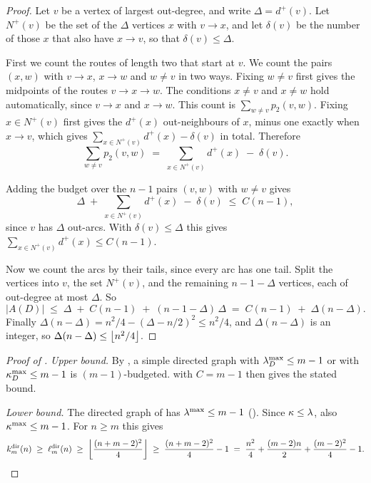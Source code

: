 \begin{proof}
Let $v$ be a vertex of largest out-degree, and write $\Delta = d^+(v)$.
Let $N^+(v)$ be the set of the $\Delta$ vertices $x$ with $v \to x$, and let $\delta(v)$ be the number of those $x$ that also have $x \to v$, so that $\delta(v) \le \Delta$.

First we count the routes of length two that start at $v$.
We count the pairs $(x,w)$ with $v\to x$, $x\to w$ and $w\ne v$ in two ways.
Fixing $w \ne v$ first gives the midpoints of the routes $v\to x\to w$. The conditions $x\ne v$ and $x\ne w$ hold automatically, since $v\to x$ and $x\to w$. This count is $\sum_{w\ne v} p_2(v,w)$.
Fixing $x \in N^+(v)$ first gives the $d^+(x)$ out-neighbours of $x$, minus one exactly when $x\to v$, which gives $\sum_{x\in N^+(v)} d^+(x) - \delta(v)$ in total.
Therefore
\[
    \sum_{w\ne v} p_2(v,w) \;=\; \sum_{x\in N^+(v)} d^+(x) \;-\; \delta(v).
\]

Adding the budget over the $n-1$ pairs $(v,w)$ with $w\ne v$ gives
\[
    \Delta \;+\; \sum_{x\in N^+(v)} d^+(x) \;-\; \delta(v) \;\le\; C(n-1),
\]
since $v$ has $\Delta$ out-arcs. With $\delta(v)\le\Delta$ this gives $\sum_{x\in N^+(v)} d^+(x) \le C(n-1)$.

Now we count the arcs by their tails, since every arc has one tail. Split the vertices into $v$, the set $N^+(v)$, and the remaining $n-1-\Delta$ vertices, each of out-degree at most $\Delta$. So
\[
    |A(D)| \;\le\; \Delta \;+\; C(n-1) \;+\; (n-1-\Delta)\,\Delta \;=\; C(n-1) \;+\; \Delta(n-\Delta).
\]
Finally $\Delta(n-\Delta) = n^2/4 - (\Delta-n/2)^2 \le n^2/4$, and $\Delta(n-\Delta)$ is an integer, so $\Delta(n-\Delta)\le\left\lfloor n^2/4 \right\rfloor$.
\end{proof}

\begin{proof}[Proof of ]
\emph{Upper bound.}
By , a simple directed graph with $\lambda^{\max}_D \le m-1$ or with $\kappa^{\max}_D \le m-1$ is $(m-1)$-budgeted.
 with $C = m-1$ then gives the stated bound.

\emph{Lower bound.}
The directed graph of  has $\lambda^{\max} \le m-1$ (). Since $\kappa \le \lambda$, also $\kappa^{\max} \le m-1$. For $n\ge m$ this gives
\[
    k_m^{\mathrm{dir}}(n) \;\ge\; \ell_m^{\mathrm{dir}}(n) \;\ge\; \left\lfloor \frac{(n+m-2)^2}{4} \right\rfloor
    \;\ge\; \frac{(n+m-2)^2}{4} - 1
    \;=\; \frac{n^2}{4} + \frac{(m-2)n}{2} + \frac{(m-2)^2}{4} - 1.
\]
\end{proof}


